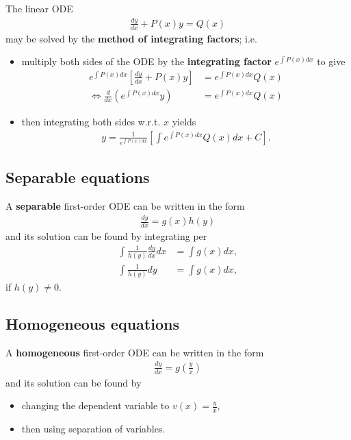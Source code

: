 \documentclass{article}
\begin{document}
\begin{theorem}
    The linear ODE
    \begin{align*}
        \frac{dy}{dx}+P(x)y = Q(x)
    \end{align*}
    may be solved by the \textbf{method of integrating factors}; i.e.
    \begin{itemize}
        \item multiply both sides of the ODE by the \textbf{integrating factor} $e^{\int P(x)dx}$ to give\begin{align*}
                  e^{\int P(x)dx}\left[\frac{dy}{dx}+P(x)y\right]           & = e^{\int P(x)dx}Q(x) \\
                  \Leftrightarrow \frac{d}{dx}\left(e^{\int P(x)dx}y\right) & =e^{\int P(x)dx}Q(x)
              \end{align*}
        \item then integrating both sides w.r.t. $x$ yields \begin{align*}
                  y = \frac{1}{e^{\int P(x)dx}}\left[\int e^{\int P(x)dx}Q(x)dx + C\right].
              \end{align*}
    \end{itemize}
\end{theorem}


\subsection{Separable equations}


\begin{theorem}
    A \textbf{separable} first-order ODE can be written in the form
    \begin{align*}
        \frac{dy}{dx}=g(x)h(y)
    \end{align*}
    and its solution can be found by integrating per
    \begin{align*}
        \int \frac{1}{h(y)}\frac{dy}{dx}dx & = \int g(x)dx, \\
        \int \frac{1}{h(y)}dy              & = \int g(x)dx,
    \end{align*}
    if $h(y)\not=0$.
\end{theorem}


\subsection{Homogeneous equations}


\begin{theorem}
    A \textbf{homogeneous} first-order ODE can be written in the form
    \begin{align*}
        \frac{dy}{dx} = g\left(\frac{y}{x}\right)
    \end{align*}
    and its solution can be found by
    \begin{itemize}
        \item changing the dependent variable to $v(x)=\frac{y}{x}$,
        \item then using separation of variables.
    \end{itemize}
\end{theorem}
\end{document}
